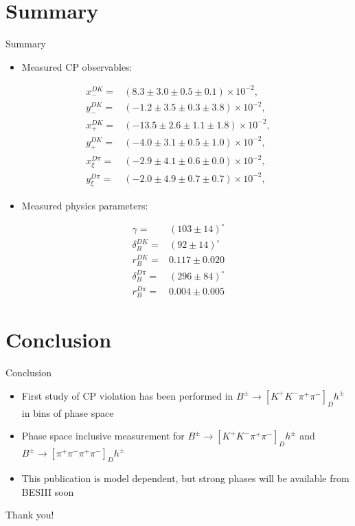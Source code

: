 \documentclass{beamer}
\begin{document}
\section{Summary}

\begin{frame}{Summary}
  \begin{itemize}
    \item{Measured CP observables:}
  \end{itemize}
  \vspace{-0.2cm}
  \begin{align*}
    x_-^{DK} =& (8.3 \pm 3.0 \pm 0.5 \pm 0.1)\times 10^{-2}, \\
    y_-^{DK} =& (-1.2 \pm 3.5 \pm 0.3 \pm 3.8)\times 10^{-2}, \\
    x_+^{DK} =& (-13.5 \pm 2.6 \pm 1.1 \pm 1.8)\times 10^{-2}, \\
    y_+^{DK} =& (-4.0 \pm 3.1 \pm 0.5 \pm 1.0)\times 10^{-2}, \\
    x_\xi^{D\pi} =& (-2.9 \pm 4.1 \pm 0.6 \pm 0.0)\times 10^{-2}, \\
    y_\xi^{D\pi} =& (-2.0 \pm 4.9 \pm 0.7 \pm 0.7)\times 10^{-2},
  \end{align*}
  \vspace{-0.5cm}
  \begin{itemize}
    \item{Measured physics parameters:}
  \end{itemize}
  \vspace{-0.2cm}
  \begin{align*}
    \gamma =& (103\pm14)^\circ \\
    \delta_B^{DK} =& (92\pm14)^\circ \\
    r_B^{DK} =& 0.117\pm0.020 \\
    \delta_B^{D\pi} =& (296\pm84)^\circ \\
    r_B^{D\pi} =& 0.004\pm0.005
  \end{align*}
\end{frame}

\section{Conclusion}

\begin{frame}{Conclusion}
  \begin{itemize}
    \setlength\itemsep{2em}
    \item{First study of CP violation has been performed in $B^\pm\to[K^+K^-\pi^+\pi^-]_D h^\pm$ in bins of phase space}
    \item{Phase space inclusive measurement for $B^\pm\to[K^+K^-\pi^+\pi^-]_D h^\pm$ and $B^\pm\to[\pi^+\pi^-\pi^+\pi^-]_D h^\pm$}
    \item{This publication is model dependent, but strong phases will be available from BESIII soon}
  \end{itemize}
  \begin{center}
    \Huge Thank you!
  \end{center}
\end{frame}
\end{document}
